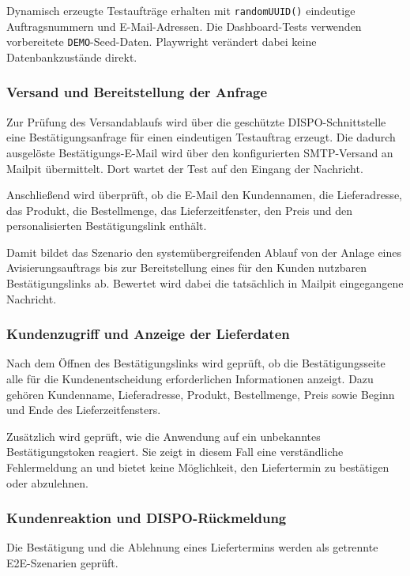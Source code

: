 Dynamisch erzeugte Testaufträge erhalten mit
\texttt{randomUUID()} eindeutige Auftragsnummern und
E-Mail-Adressen. Die Dashboard-Tests verwenden vorbereitete
\texttt{DEMO}-Seed-Daten. Playwright verändert dabei keine
Datenbankzustände direkt.

\subsubsection{Versand und Bereitstellung der Anfrage}

Zur Prüfung des Versandablaufs wird über die geschützte
DISPO-Schnittstelle eine Bestätigungsanfrage für einen
eindeutigen Testauftrag erzeugt. Die dadurch ausgelöste
Bestätigungs-E-Mail wird über den konfigurierten SMTP-Versand
an Mailpit übermittelt. Dort wartet der Test auf den Eingang
der Nachricht.

Anschließend wird überprüft, ob die E-Mail den Kundennamen, die
Lieferadresse, das Produkt, die Bestellmenge, das
Lieferzeitfenster, den Preis und den personalisierten
Bestätigungslink enthält.

Damit bildet das Szenario den systemübergreifenden Ablauf von
der Anlage eines Avisierungsauftrags bis zur Bereitstellung
eines für den Kunden nutzbaren Bestätigungslinks ab. Bewertet
wird dabei die tatsächlich in Mailpit eingegangene Nachricht.

\subsubsection{Kundenzugriff und Anzeige der Lieferdaten}

Nach dem Öffnen des Bestätigungslinks wird geprüft, ob die
Bestätigungsseite alle für die Kundenentscheidung erforderlichen
Informationen anzeigt. Dazu gehören Kundenname, Lieferadresse,
Produkt, Bestellmenge, Preis sowie Beginn und Ende des
Lieferzeitfensters.

Zusätzlich wird geprüft, wie die Anwendung auf ein unbekanntes
Bestätigungstoken reagiert. Sie zeigt in diesem Fall eine
verständliche Fehlermeldung an und bietet keine Möglichkeit,
den Liefertermin zu bestätigen oder abzulehnen.

\subsubsection{Kundenreaktion und DISPO-Rückmeldung}

Die Bestätigung und die Ablehnung eines Liefertermins werden als
getrennte E2E-Szenarien geprüft.

